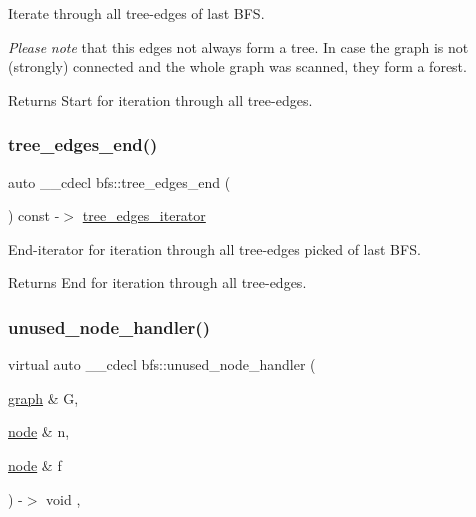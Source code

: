 Iterate through all tree-\/edges of last B\+FS. 

{\itshape Please} {\itshape note} that this edges not always form a tree. In case the graph is not (strongly) connected and the whole graph was scanned, they form a forest.

\begin{DoxyReturn}{Returns}
Start for iteration through all tree-\/edges. 
\end{DoxyReturn}
\mbox{\label{classbfs_a55e57b15957b08f3334568eeefb4223a}} 
\subsubsection{\texorpdfstring{tree\+\_\+edges\+\_\+end()}{tree\_edges\_end()}}
{\footnotesize\ttfamily auto \+\_\+\+\_\+cdecl bfs\+::tree\+\_\+edges\+\_\+end (\begin{DoxyParamCaption}{ }\end{DoxyParamCaption}) const -\/$>$ \mbox{\hyperlink{classbfs_aa0b58a03ca2fc32117948ab27a806bd1}{tree\+\_\+edges\+\_\+iterator}}
	\hspace{0.3cm}{\ttfamily [inline]}}



End-\/iterator for iteration through all tree-\/edges picked of last B\+FS. 

\begin{DoxyReturn}{Returns}
End for iteration through all tree-\/edges. 
\end{DoxyReturn}
\mbox{\label{classbfs_a39cda7554a4ddce1331af32271904faa}} 
\subsubsection{\texorpdfstring{unused\+\_\+node\+\_\+handler()}{unused\_node\_handler()}}
{\footnotesize\ttfamily virtual auto \+\_\+\+\_\+cdecl bfs\+::unused\+\_\+node\+\_\+handler (\begin{DoxyParamCaption}\item[{\mbox{\hyperlink{classgraph}{graph}} \&}]{G,  }\item[{\mbox{\hyperlink{classnode}{node}} \&}]{n,  }\item[{\mbox{\hyperlink{classnode}{node}} \&}]{f }\end{DoxyParamCaption}) -\/$>$ void \hspace{0.3cm}{\ttfamily [inline]}, {\ttfamily [virtual]}}



